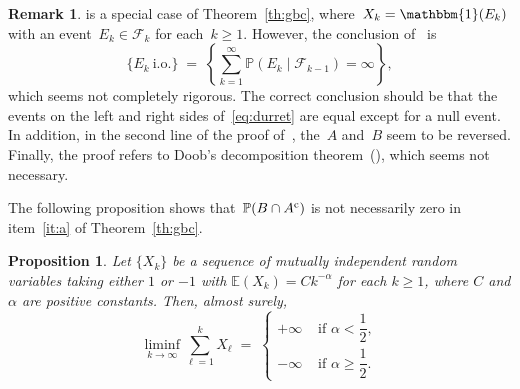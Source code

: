 \documentclass[12pt,a4paper]{article}  %
\newcounter{cite}
\newtheorem{proposition}{Proposition}[section]
\theoremstyle{definition}
\newtheorem{remark}{Remark}[section]
\numberwithin{equation}{section}
\newcommand{\ind}{\mathbbm{1}}
\newcommand{\FF}{\mathcal{F}}
\newcommand{\io}{{\text{i.o.}}\xspace}
\newcommand{\comp}{{\textnormal{c}}}
\renewcommand{\Pr}{\mathbb{P}}
\begin{document}
\begin{remark}
    \label{rem:durret}
    \cite[Theorem~4.3.4]{Durrett_2019} is a special case of Theorem~\ref{th:gbc}, where~$X_k
    = \ind(E_k)$ with an event~$E_k \in \FF_k$ for each~$k\ge 1$.
    However, the conclusion of~\cite[Theorem~4.3.4]{Durrett_2019}
    is
    \begin{equation}
        \label{eq:durret}
        \{E_k~\io\} \;=\; \left\{\sum_{k=1}^\infty \Pr(E_k\mathrel{|}\FF_{k-1})
        = \infty\right\},
    \end{equation}
    which seems not completely rigorous. The correct conclusion should be that the events on the
    left and right sides of~\eqref{eq:durret} are equal except for a null event.
    In addition, in the second line of the proof of~\cite[Theorem~4.3.4]{Durrett_2019},
    the~$A$ and~$B$ seem to be reversed. Finally, the proof refers to Doob's decomposition
    theorem~(\cite[Theorem~4.3.2]{Durrett_2019}), which seems not necessary.
\end{remark}

The following proposition shows that~$\Pr(B\cap A^\comp)$ is not necessarily zero in
item~\ref{it:a} of Theorem~\ref{th:gbc}.
\begin{proposition}
    \label{prop:sum}
    Let $\{X_k\}$ be a sequence of mutually independent random variables taking either $1$ or $-1$ with
$\mathbb{E}(X_k) = Ck^{-\alpha}$ for each $k\ge 1$,
where $C$ and $\alpha$ are positive constants.
Then, almost surely,
\[
\liminf_{k\to \infty} \sum_{\ell=1}^k X_\ell \;=\;
\begin{cases}
+\infty & \text{ if } \alpha < \dfrac{1}{2}, \\[2ex]
-\infty & \text{ if } \alpha \ge \dfrac{1}{2}.
\end{cases}
\]
\end{proposition}
\end{document}
